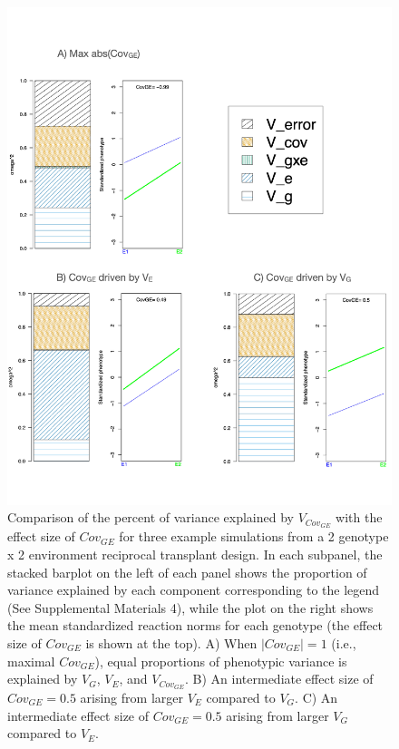 \documentclass[11pt, oneside]{amsart}
\begin{document}
\renewcommand\thefigure{S6}
\begin{figure}[h]
\begin{center}
\includegraphics[width=6in]{Figs/EstimateVsVariance.pdf}
\end{center}
\label{Fig: }
\caption[Comparison of the percent of variance explained by $V_{Cov_{GE}}$ with the effect size $Cov_{GE}$ for three example simulations from a 2 genotype x 2 environment reciprocal transplant design.]{Comparison of the percent of variance explained by $V_{Cov_{GE}}$ with the effect size of $Cov_{GE}$ for three example simulations from a 2 genotype x 2 environment reciprocal transplant design. In each subpanel, the stacked barplot on the left of each panel shows the proportion of variance explained by each component corresponding to the legend (See Supplemental Materials 4), while the plot on the right shows the mean standardized reaction norms for each genotype (the effect size of $Cov_{GE}$ is shown at the top). A) When $| Cov_{GE} | = 1$ (i.e., maximal $Cov_{GE}$), equal proportions of phenotypic variance is explained by $V_G$, $V_E$, and $V_{Cov_{GE}}$. B) An intermediate effect size of  $Cov_{GE} = 0.5$ arising from larger $V_E$ compared to $V_G$.  C) An intermediate effect size of  $Cov_{GE} = 0.5$ arising from larger $V_G$ compared to $V_E$.  }
\end{figure}
\end{document}
